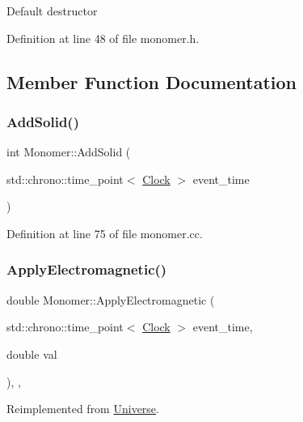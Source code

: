 Default destructor 

Definition at line 48 of file monomer.\+h.



\subsection{Member Function Documentation}
\mbox{\label{class_monomer_ac03023c0d1bb67e5f11091af7ad3735d}} 
\subsubsection{\texorpdfstring{Add\+Solid()}{AddSolid()}}
{\footnotesize\ttfamily int Monomer\+::\+Add\+Solid (\begin{DoxyParamCaption}\item[{std\+::chrono\+::time\+\_\+point$<$ \mbox{\hyperlink{universe_8h_a0ef8d951d1ca5ab3cfaf7ab4c7a6fd80}{Clock}} $>$}]{event\+\_\+time }\end{DoxyParamCaption})}



Definition at line 75 of file monomer.\+cc.

\mbox{\label{class_monomer_ae64dfbf82610ae26427be9c824aef70f}} 
\subsubsection{\texorpdfstring{Apply\+Electromagnetic()}{ApplyElectromagnetic()}}
{\footnotesize\ttfamily double Monomer\+::\+Apply\+Electromagnetic (\begin{DoxyParamCaption}\item[{std\+::chrono\+::time\+\_\+point$<$ \mbox{\hyperlink{universe_8h_a0ef8d951d1ca5ab3cfaf7ab4c7a6fd80}{Clock}} $>$}]{event\+\_\+time,  }\item[{double}]{val }\end{DoxyParamCaption})\hspace{0.3cm}{\ttfamily [inline]}, {\ttfamily [final]}, {\ttfamily [virtual]}}



Reimplemented from \mbox{\hyperlink{class_universe_a1f787da78fa196ba635db21a9e91dabb}{Universe}}.



